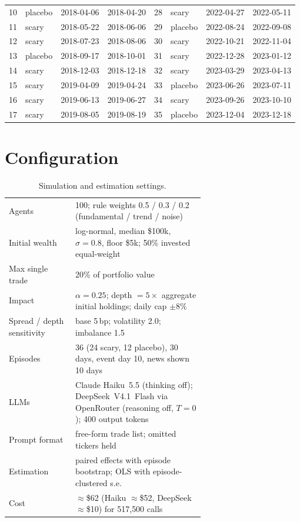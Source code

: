 \documentclass[10pt]{article}
\begin{document}
\begin{table}[H]
\begin{tabular}{llll@{\quad}llll}
    10 & placebo & 2018-04-06 & 2018-04-20 & 28 & scary & 2022-04-27 & 2022-05-11 \\
    11 & scary & 2018-05-22 & 2018-06-06 & 29 & placebo & 2022-08-24 & 2022-09-08 \\
    12 & scary & 2018-07-23 & 2018-08-06 & 30 & scary & 2022-10-21 & 2022-11-04 \\
    13 & placebo & 2018-09-17 & 2018-10-01 & 31 & scary & 2022-12-28 & 2023-01-12 \\
    14 & scary & 2018-12-03 & 2018-12-18 & 32 & scary & 2023-03-29 & 2023-04-13 \\
    15 & scary & 2019-04-09 & 2019-04-24 & 33 & placebo & 2023-06-26 & 2023-07-11 \\
    16 & scary & 2019-06-13 & 2019-06-27 & 34 & scary & 2023-09-26 & 2023-10-10 \\
    17 & scary & 2019-08-05 & 2019-08-19 & 35 & placebo & 2023-12-04 & 2023-12-18 \\
    \bottomrule
  \end{tabular}
\end{table}

\section{Configuration}
\begin{table}[H]
  \centering\small
  \caption{Simulation and estimation settings.}
  \begin{tabular}{lp{0.66\linewidth}}
    \toprule
    Agents & 100; rule weights 0.5 / 0.3 / 0.2 (fundamental / trend / noise) \\
    Initial wealth & log-normal, median \$100k, $\sigma=0.8$, floor \$5k; 50\% invested equal-weight \\
    Max single trade & 20\% of portfolio value \\
    Impact & $\alpha=0.25$; depth $=5\times$ aggregate initial holdings; daily cap $\pm 8\%$ \\
    Spread / depth sensitivity & base 5\,bp; volatility 2.0; imbalance 1.5 \\
    Episodes & 36 (24 scary, 12 placebo), 30 days, event day 10, news shown 10 days \\
    LLMs & Claude Haiku~5.5 (thinking off); DeepSeek~V4.1~Flash via OpenRouter (reasoning off, $T=0$); 400 output tokens \\
    Prompt format & free-form trade list; omitted tickers held \\
    Estimation & paired effects with episode bootstrap; OLS with episode-clustered s.e. \\
    Cost & $\approx$\$62 (Haiku $\approx$\$52, DeepSeek $\approx$\$10) for 517{,}500 calls \\
    \bottomrule
  \end{tabular}
\end{table}
\end{document}
